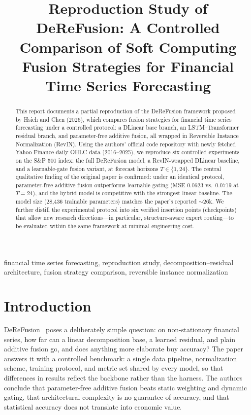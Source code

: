 \documentclass[conference]{IEEEtran}
\begin{document}
\title{Reproduction Study of DeReFusion: A Controlled Comparison of Soft
Computing Fusion Strategies for Financial Time Series Forecasting}

\author{
}

\maketitle

\begin{abstract}
This report documents a partial reproduction of the DeReFusion framework
proposed by Hsieh and Chen (2026), which compares fusion strategies for
financial time series forecasting under a controlled protocol: a DLinear
base branch, an LSTM--Transformer residual branch, and parameter-free
additive fusion, all wrapped in Reversible Instance Normalization (RevIN).
Using the authors' official code repository with newly fetched Yahoo
Finance daily OHLC data (2016--2025), we reproduce six controlled
experiments on the S\&P 500 index: the full DeReFusion model, a
RevIN-wrapped DLinear baseline, and a learnable-gate fusion variant, at
forecast horizons $T\in\{1,24\}$. The central qualitative finding of the
original paper is confirmed: under an identical protocol, parameter-free
additive fusion outperforms learnable gating (MSE 0.0623 vs.\ 0.0719 at
$T=24$), and the hybrid model is competitive with the strongest linear
baseline. The model size (28,436 trainable parameters) matches the paper's
reported ${\sim}26$k. We further distill the experimental protocol into six
verified insertion points (checkpoints) that allow new research
directions---in particular, structure-aware expert routing---to be
evaluated within the same framework at minimal engineering cost.
\end{abstract}

\begin{IEEEkeywords}
financial time series forecasting, reproduction study,
decomposition--residual architecture, fusion strategy comparison,
reversible instance normalization
\end{IEEEkeywords}

\section{Introduction}

DeReFusion~\cite{hsieh2026derefusion} poses a deliberately simple question:
on non-stationary financial series, how far can a linear decomposition
base, a learned residual, and plain additive fusion go, and does anything
more elaborate buy accuracy? The paper answers it with a controlled
benchmark: a single data pipeline, normalization scheme, training protocol,
and metric set shared by every model, so that differences in results
reflect the backbone rather than the harness. The authors conclude that
parameter-free additive fusion beats static weighting and dynamic gating,
that architectural complexity is no guarantee of accuracy, and that
statistical accuracy does not translate into economic value.
\end{document}
